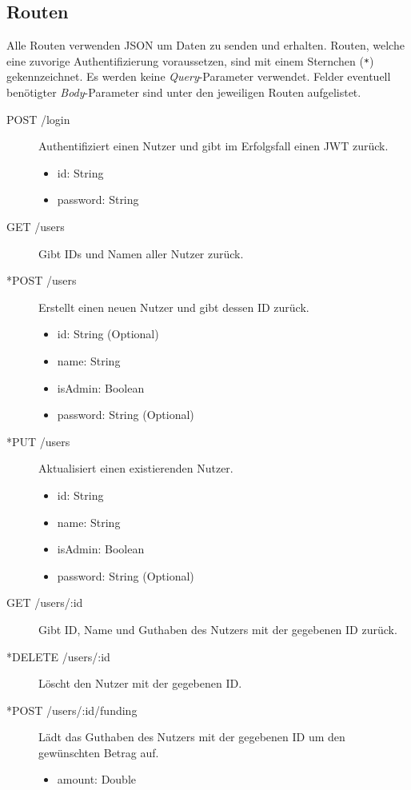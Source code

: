 \begin{appendix}
\chapter{Routen}
\label{ch:appendix:routes}

Alle Routen verwenden JSON um Daten zu senden und erhalten.
Routen, welche eine zuvorige Authentifizierung voraussetzen, sind mit einem Sternchen (\verb|*|) gekennzeichnet.
Es werden keine \textit{Query}-Parameter verwendet.
Felder eventuell benötigter \textit{Body}-Parameter sind unter den jeweiligen Routen aufgelistet.

\begin{description}
	\item[POST /login] Authentifiziert einen Nutzer und gibt im Erfolgsfall einen JWT zurück.
	\begin{itemize}
		\item id: String
		\item password: String
	\end{itemize}

	\item[GET /users] Gibt IDs und Namen aller Nutzer zurück.
	
	\item[*POST /users] Erstellt einen neuen Nutzer und gibt dessen ID zurück.
	\begin{itemize}
		\item id: String (Optional)
		\item name: String
		\item isAdmin: Boolean
		\item password: String (Optional)
	\end{itemize}

	\item[*PUT /users] Aktualisiert einen existierenden Nutzer.
	\begin{itemize}
		\item id: String
		\item name: String
		\item isAdmin: Boolean
		\item password: String (Optional)
	\end{itemize}

	\item[GET /users/:id] Gibt ID, Name und Guthaben des Nutzers mit der gegebenen ID zurück.
	
	\item[*DELETE /users/:id] Löscht den Nutzer mit der gegebenen ID.
	
	\item[*POST /users/:id/funding] Lädt das Guthaben des Nutzers mit der gegebenen ID um den gewünschten Betrag auf.
	\begin{itemize}
		\item amount: Double
	\end{itemize}


\end{description}
\end{appendix}

